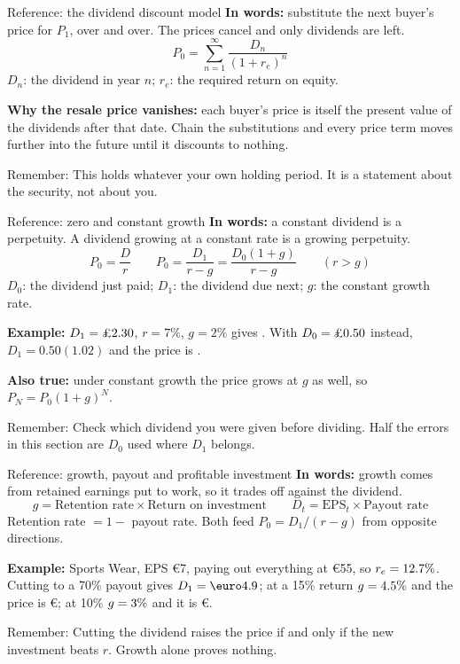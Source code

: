 \documentclass[10pt,aspectratio=169]{beamer}
\newcommand{\remember}[1]{\par\smallskip\alert{Remember:} #1}
\renewcommand{\pounds}{\ifmmode\text{\textsterling}\else\textsterling\fi}
\begin{document}
\begin{frame}[label=ddm]{Reference: the dividend discount model}
\textbf{In words:} substitute the next buyer's price for $P_1$, over and over. The prices cancel and only dividends are left.
\[
P_0=\sum_{n=1}^{\infty}\frac{D_n}{(1+r_e)^n}
\]
$D_n$: the dividend in year $n$; $r_e$: the required return on equity.
\par\smallskip
\textbf{Why the resale price vanishes:} each buyer's price is itself the present value of the dividends after that date. Chain the substitutions and every price term moves further into the future until it discounts to nothing.
\remember{This holds whatever your own holding period. It is a statement about the security, not about you.}
\end{frame}

\begin{frame}[label=gordon]{Reference: zero and constant growth}
\textbf{In words:} a constant dividend is a perpetuity. A dividend growing at a constant rate is a growing perpetuity.
\[
P_0=\frac{D}{r}
\qquad
P_0=\frac{D_1}{r-g}=\frac{D_0(1+g)}{r-g}
\qquad (r>g)
\]
$D_0$: the dividend just paid; $D_1$: the dividend due next; $g$: the constant growth rate.
\par\smallskip
\textbf{Example:} $D_1=\pounds2.30$, $r=7\%$, $g=2\%$ gives \pounds\LEdisonPrice. With $D_0=\pounds0.50$ instead, $D_1=0.50(1.02)$ and the price is \pounds\LBlueSkiesPrice.
\par\smallskip
\textbf{Also true:} under constant growth the price grows at $g$ as well, so $P_N=P_0(1+g)^N$.
\remember{Check which dividend you were given before dividing. Half the errors in this section are $D_0$ used where $D_1$ belongs.}
\end{frame}

\begin{frame}[label=growth]{Reference: growth, payout and profitable investment}
\textbf{In words:} growth comes from retained earnings put to work, so it trades off against the dividend.
\[
g=\text{Retention rate}\times\text{Return on investment}
\qquad
D_t=\text{EPS}_t\times\text{Payout rate}
\]
Retention rate $=1-$ payout rate. Both feed $P_0=D_1/(r-g)$ from opposite directions.
\par\smallskip
\textbf{Example:} Sports Wear, EPS \euro7, paying out everything at \euro55, so $r_e=12.7\%$. Cutting to a 70\% payout gives $D_1=\euro\LSportsDividend$; at a 15\% return $g=4.5\%$ and the price is \euro\LSportsPrice; at 10\% $g=3\%$ and it is \euro\LSportsPriceBad.
\remember{Cutting the dividend raises the price if and only if the new investment beats $r$. Growth alone proves nothing.}
\end{frame}
\end{document}
